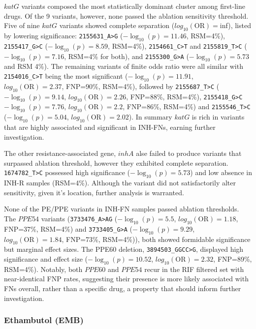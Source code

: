 $katG$ variants composed the most statistically dominant cluster among first-line drugs. Of the 9 variants, however, none passed the ablation sensitivity threshold. Five of nine  $katG$ variants  showed complete separation ($log_{10}(\text{OR})=$inf), listed by lowering significance: 
\texttt{2155631\_A>G} ($-\log_{10}(p)=11.46$, RSM=4\%), \texttt{2155417\_G>C} ($-\log_{10}(p)=8.59$, RSM=4\%), \texttt{2154661\_C>T} and \texttt{2155819\_T>C} ($-\log_{10}(p)=7.16$, RSM=4\% for both), and \texttt{2155300\_G>A} ($-\log_{10}(p)=5.73$ and RSM 4\%). The remaining variants of finite odds ratio were all similar with \texttt{2154016\_C>T} being the most significant ($-\log_{10}(p)=11.91$, $log_{10}(\text{OR})=2.37$, FNP=90\%, RSM=4\%), followed by \texttt{2155687\_T>C} ($-\log_{10}(p)=9.14$, $log_{10}(\text{OR})=2.26$, FNP=88\%, RSM=4\%), \texttt{2155418\_G>C} $-\log_{10}(p)=7.76$, $log_{10}(\text{OR})=2.2$, FNP=86\%, RSM=4\%) and \texttt{2155546\_T>C} ($-\log_{10}(p)=5.04$, $log_{10}(\text{OR})=2.02$). In summary $katG$ is rich in variants that are highly associated and significant in INH-FNs, earning further investigation.

The other resistance-associated gene, $inhA$ alse failed to produce variants that surpassed ablation threshold, however they exhibited complete separation. \texttt{1674782\_T>C} possessed high significance ($-\log_{10}(p)=5.73$) and low absence in INH-R samples (RSM=4\%). Although the variant did not satisfactorily alter sensitivity, given it's location, further analysis is warranted. 

None of the PE/PPE variants in INH-FN samples passed ablation thresholds. The $PPE54$ variants (\texttt{3733476\_A>AG} ($-\log_{10}(p)=5.5$, $log_{10}(\text{OR})=1.18$, FNP=37\%, RSM=4\%) and \texttt{3733405\_G>A} ($-\log_{10}(p)=9.29$, $log_{10}(\text{OR})=1.84$, FNP=73\%, RSM=4\%)), both showed formidable significance but marginal effect sizes. The PPE60 deletion, \texttt{3894503\_GGCC>G}, displayed high significance and effect size ($-\log_{10}(p)=10.52$, $log_{10}(\text{OR})=2.32$, FNP=89\%, RSM=4\%). Notably, both $PPE60$ and $PPE54$ recur in the RIF filtered set with near-identical FNP rates, suggesting their presence is more likely associated with FNs overall, rather than a specific drug, a property that should inform further investigation.

\subsubsection{Ethambutol (EMB)}

